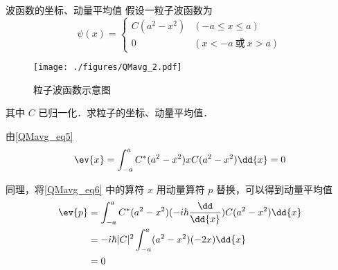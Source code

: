 \begin{example}{波函数的坐标、动量平均值}
假设一粒子波函数为
\begin{equation}
\psi(x)=
\begin{cases}
C(a^2-x^2) &(-a\leqslant x\leqslant a)\\
0 &(x<-a \ \text{或}\ x>a) 
\end{cases}
\end{equation}
\begin{figure}[ht]
\centering
\texttt{[image: ./figures/QMavg\_2.pdf]}
\caption{粒子波函数示意图} \label{QMavg_fig2}
\end{figure}
其中 $C$ 已归一化．求粒子的坐标、动量平均值．

由\autoref{QMavg_eq5} 
\begin{equation}\label{QMavg_eq6}
\ev{x}= \int_{-a}^a C^*(a^2-x^2)xC(a^2-x^2)\dd{x} = 0
\end{equation}

同理，将\autoref{QMavg_eq6} 中的算符 $x$ 用动量算符 $p$ 替换，可以得到动量平均值
\begin{equation}
\begin{aligned}
\ev{p} &= \int_{-a}^a C^*(a^2-x^2)(-i\hbar\frac{\dd}{\dd{x}})C(a^2-x^2)\dd{x}\\
&= -i\hbar |C|^2\int_{-a}^a (a^2-x^2)(-2x)\dd{x}\\
&= 0
\end{aligned}
\end{equation}
\end{example}






